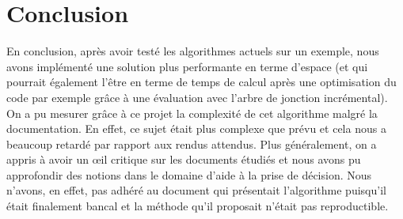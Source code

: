 \documentclass[12pt]{article}
\begin{document}
\section{Conclusion}
En conclusion, après avoir testé les algorithmes actuels sur un exemple, nous avons implémenté une solution plus performante en terme d'espace (et qui pourrait également l'être en terme de temps de calcul après une optimisation du code par exemple grâce à une évaluation avec l'arbre de jonction incrémental).
On a pu mesurer grâce à ce projet la complexité de cet algorithme malgré la documentation. En effet, ce sujet était plus complexe que prévu et cela nous a beaucoup retardé par rapport aux rendus attendus.
Plus généralement, on a appris à avoir un œil critique sur les documents étudiés et nous avons pu approfondir des notions dans le domaine d'aide à la prise de décision.
Nous n'avons, en effet, pas adhéré au document qui présentait l'algorithme puisqu'il était finalement bancal et la méthode qu'il proposait n'était pas reproductible.
 



\newpage
\end{document}
